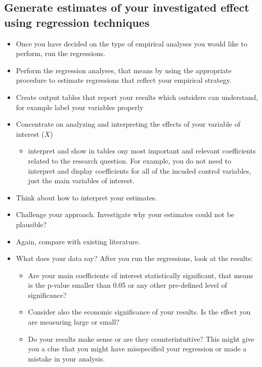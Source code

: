 \documentclass[
]{book}
\providecommand{\tightlist}{%
  \setlength{\itemsep}{0pt}\setlength{\parskip}{0pt}}
\begin{document}
\hypertarget{generate-estimates-of-your-investigated-effect-using-regression-techniques}{%
\subsection{Generate estimates of your investigated effect using
regression
techniques}\label{generate-estimates-of-your-investigated-effect-using-regression-techniques}}

\begin{itemize}
\item
  Once you have decided on the type of empirical analyses you would like
  to perform, run the regressions.
\item
  Perform the regression analyses, that means by using the appropriate
  procedure to estimate regressions that reflect your empirical
  strategy.
\item
  Create output tables that report your results which outsiders can
  understand, for example label your variables properly
\item
  Concentrate on analyzing and interpreting the effects of your variable
  of interest (\(X\))

  \begin{itemize}
  \tightlist
  \item
    interpret and show in tables ony most important and relevant
    coefficients related to the research question. For example, you do
    not need to interpret and display coefficients for all of the
    incuded control variables, just the main variables of interest.
  \end{itemize}
\item
  Think about how to interpret your estimates.
\item
  Challenge your approach. Investigate why your estimates could not be
  plausible?
\item
  Again, compare with existing literature.
\item
  What does your data say? After you run the regressions, look at the
  results:

  \begin{itemize}
  \tightlist
  \item
    Are your main coefficients of interest statistically significant,
    that means is the p-value smaller than 0.05 or any other pre-defined
    level of significance?
  \item
    Consider also the economic significance of your results. Is the
    effect you are measuring large or small?
  \item
    Do your results make sense or are they counterintuitive? This might
    give you a clue that you might have misspecified your regression or
    made a mistake in your analysis.
  \end{itemize}
\end{itemize}
\end{document}

